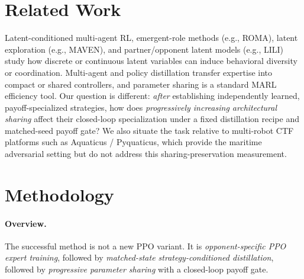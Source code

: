 \documentclass{article}
\begin{document}
\section{Related Work}
\label{sec:related}

Latent-conditioned multi-agent RL, emergent-role methods (e.g., ROMA), latent
exploration (e.g., MAVEN), and partner/opponent latent models (e.g., LILI)
study how discrete or continuous latent variables can induce behavioral
diversity or coordination. Multi-agent and policy distillation transfer
expertise into compact or shared controllers, and parameter sharing is a
standard MARL efficiency tool. Our question is different: \emph{after}
establishing independently learned, payoff-specialized strategies, how does
\emph{progressively increasing architectural sharing} affect their closed-loop
specialization under a fixed distillation recipe and matched-seed payoff gate?
We also situate the task relative to multi-robot CTF platforms such as
Aquaticus / Pyquaticus, which provide the maritime adversarial setting but do
not address this sharing-preservation measurement.

\section{Methodology}
\label{sec:method}

\paragraph{Overview.}
The successful method is not a new PPO variant. It is
\emph{opponent-specific PPO expert training}, followed by
\emph{matched-state strategy-conditioned distillation}, followed by
\emph{progressive parameter sharing} with a closed-loop payoff gate.
\end{document}
